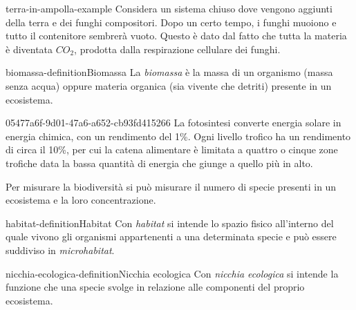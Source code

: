 \documentclass[preview]{standalone}
\begin{document}

\begin{snippetexample}{terra-in-ampolla-example}{}
    Considera un sistema chiuso dove vengono aggiunti della terra e dei funghi compositori.
    Dopo un certo tempo, i funghi muoiono e tutto il contenitore sembrerà vuoto.
    Questo è dato dal fatto che tutta la materia è diventata \(CO_2\),
    prodotta dalla respirazione cellulare dei funghi.
\end{snippetexample}


\begin{snippetdefinition}{biomassa-definition}{Biomassa}
    La \textit{biomassa} è la massa di un organismo (massa senza acqua)
    oppure materia organica (sia vivente che detriti) presente in un ecosistema.
\end{snippetdefinition}

\begin{snippet}{05477a6f-9d01-47a6-a652-cb93fd415266}
    La fotosintesi converte energia solare in energia chimica, con un rendimento del 1\%.
    Ogni livello trofico ha un rendimento di circa il 10\%, per cui la catena alimentare
    è limitata a quattro o cinque zone trofiche data la bassa quantità di energia
    che giunge a quello più in alto.

    Per misurare la biodiversità si può misurare il numero di specie presenti in un ecosistema
    e la loro concentrazione.
\end{snippet}

\begin{snippetdefinition}{habitat-definition}{Habitat}
    Con \textit{habitat} si intende lo spazio fisico all'interno del quale vivono gli organismi
    appartenenti a una determinata specie e può essere suddiviso in \textit{microhabitat}.
\end{snippetdefinition}

\begin{snippetdefinition}{nicchia-ecologica-definition}{Nicchia ecologica}
    Con \textit{nicchia ecologica} si intende la funzione che una specie svolge
    in relazione alle componenti del proprio ecosistema.
\end{snippetdefinition}

\end{document}
